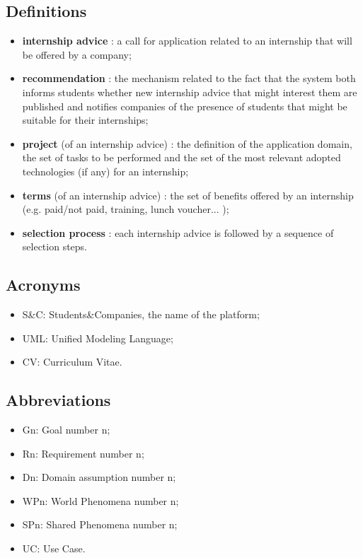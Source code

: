 		\subsection{Definitions}
			\begin{itemize}
				\item \textbf{internship advice} : a call for application related to an internship that will be offered by a company;
				\item \textbf{recommendation} : the mechanism related to the fact that the system both informs students whether new internship advice that might interest them are published and notifies companies of the presence of students that might be suitable for their internships;
				\item \textbf{project} (of an internship advice) : the definition of the application domain, the set of tasks to be performed and the set of the most relevant adopted technologies (if any) for an internship;
				\item \textbf{terms} (of an internship advice) : the set of benefits offered by an internship (e.g. paid/not paid, training, lunch voucher... );
				\item \textbf{selection process} : each internship advice is followed by a sequence of selection steps.
			\end{itemize}
		\subsection{Acronyms}
			\begin{itemize}
				\item S\&C: Students\&Companies, the name of the platform;
				\item UML: Unified Modeling Language;
				\item CV: Curriculum Vitae.
			\end{itemize}
		\subsection{Abbreviations}
			\begin{itemize}
				\item Gn: Goal number n;
				\item Rn: Requirement number n;
				\item Dn: Domain assumption number n;
				\item WPn: World Phenomena number n;
				\item SPn: Shared Phenomena number n;
				\item UC: Use Case.
			\end{itemize}
